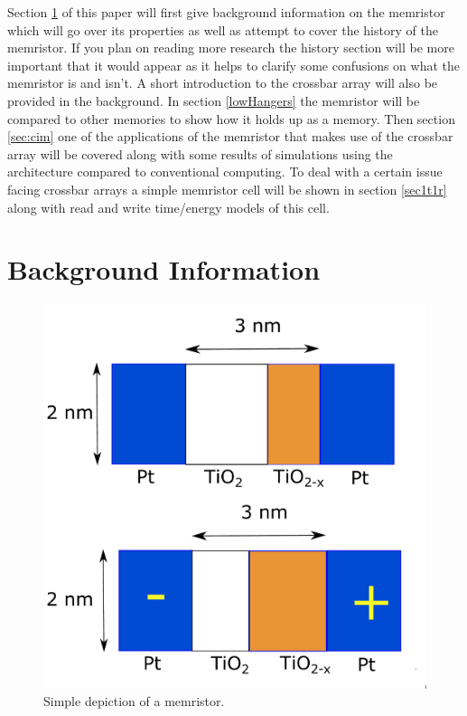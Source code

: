 \documentclass{sig-alternate}
\begin{document}
Section \ref{sec:background} of this paper will first give background information on the memristor which will go over its properties as well as attempt to cover the history of the memristor.  If you plan on reading more research the history section will be more important that it would appear as it helps to clarify some confusions on what the memristor is and isn't.  A short introduction to the crossbar array will also be provided in the background.  In section \ref{lowHangers} the memristor will be compared to other memories to show how it holds up as a memory.  Then section \ref{sec:cim} one of the applications of the memristor that makes use of the crossbar array will be covered along with some results of simulations using the architecture compared to conventional computing.  To deal with a certain issue facing crossbar arrays a simple memristor cell will be shown in section \ref{sec1t1r} along with read and write time/energy models of this cell.
\section{Background Information}
\label{sec:background}

\begin{figure}
  \includegraphics[width=\linewidth]{memristor.pdf}
  \caption{Simple depiction of a memristor.}
  \label{fig:memristor}
\end{figure}
\end{document}

